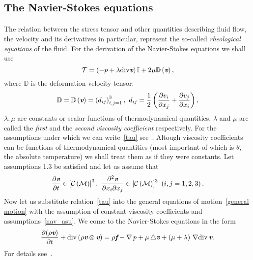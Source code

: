 \subsection{The Navier-Stokes equations}
\paragraph{}
The relation between the stress tensor and other quantities describing fluid flow, the velocity and its derivatives in particular, represent the so-called \textit{rheological equations} of the fluid. For the derivation of the Navier-Stokes equations we shall use
\begin{equation}\label{tau}
 \mathcal{T} = \left(-p+\lambda\mathrm{div}\textit{\textbf{v}}\right)\mathbb{I}+ 2\mu\mathbb{D}\left(\textit{\textbf{v}}\right),
\end{equation}
where $\mathbb{D}$ is the deformation velocity tensor:
\begin{equation}
\mathbb{D}=\mathbb{D}\lo{}\bs{v}\ro=\lo{}d_{ij}\ro_{i,j=1}^3,\ d_{ij}=\frac12\lo{}\pds{v_i}{x_j}+\pds{v_j}{x_i}\ro,
\end{equation}
$\lambda, \mu$ are constants or scalar functions of thermodynamical quantities, \upshape$\lambda$ and $\mu$ are called the \textit{first} and the \textit{second} \textit{viscosity coefficient} respectively. For the assumptions under which we can write~\eqref{tau} see~\cite{1993}.
Altough viscosity coefficients can be functions of thermodynamical quantities (most important of which is $\theta$, the absolute temperature) we shall treat them as if they were constants. Let assumptions 1.3 be satisfied and let us assume that 
\begin{equation}\label{nav_asu}
\frac{\partial{\bs{v}}}{\partial{t}}\in\left[\mathcal{C}\left(\mathcal{M}\right)\right]^3,\ \frac{\partial^2\bs{v}}{\partial{x_i}
\partial{x_j}}\in\left[\mathcal{C}\left(\mathcal{M}\right)\right]^3\ \left(i,j = 1, 2, 3\right).
\end{equation}
Now let us substitute relation~\eqref{tau} into the general equations of motion~\eqref{general motion} with the assumption of constant viscosity coefficients and assumptions~\eqref{nav_asu}. We come to the Navier-Stokes equations in the form
\begin{equation}\label{Nav-Simple}
\frac{\partial{\left(\rho\textit{\textbf{v}}\right)}}{\partial{t}} + \mathrm{div}\left(\rho\textit{\textbf{v}}\otimes\textit{\textbf{v}}\right)= \rho\textit{\textbf{f}} - \nabla\,p +
\mu\,\triangle{\textit{\textbf{v}}} + \left({}\mu+\lambda\right)\,\nabla\mathrm{div}\,\textit{\textbf{v}}.
\end{equation}
For details see~\cite{compress}.
